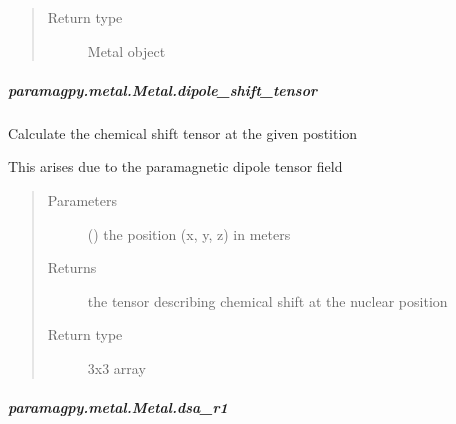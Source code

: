 \documentclass[a4paper,10pt,english,openany,oneside]{sphinxmanual}
\begin{document}
\begin{fulllineitems}
\begin{fulllineitems}
\begin{fulllineitems}
\begin{quote}
\begin{description}
\item[{Return type}] \leavevmode
Metal object

\end{description}\end{quote}

\end{fulllineitems}



\subparagraph{paramagpy.metal.Metal.dipole\_shift\_tensor}
\label{\detokenize{reference/generated/paramagpy.metal.Metal.dipole_shift_tensor:paramagpy-metal-metal-dipole-shift-tensor}}\label{\detokenize{reference/generated/paramagpy.metal.Metal.dipole_shift_tensor::doc}}

\begin{fulllineitems}
\label{\detokenize{reference/generated/paramagpy.metal.Metal.dipole_shift_tensor:paramagpy.metal.Metal.dipole_shift_tensor}}
Calculate the chemical shift tensor at the given postition

This arises due to the paramagnetic dipole tensor field
\begin{quote}\begin{description}
\item[{Parameters}] \leavevmode
{} () \textendash{} the position (x, y, z) in meters

\item[{Returns}] \leavevmode
{} \textendash{} the tensor describing chemical shift at the nuclear position

\item[{Return type}] \leavevmode
3x3 array

\end{description}\end{quote}

\end{fulllineitems}



\subparagraph{paramagpy.metal.Metal.dsa\_r1}
\label{\detokenize{reference/generated/paramagpy.metal.Metal.dsa_r1:paramagpy-metal-metal-dsa-r1}}\label{\detokenize{reference/generated/paramagpy.metal.Metal.dsa_r1::doc}}


\end{fulllineitems}
\end{fulllineitems}
\end{document}
